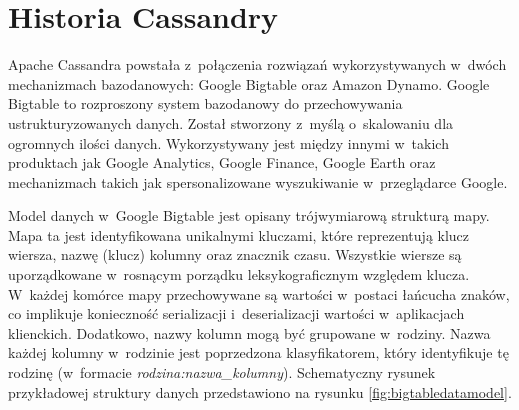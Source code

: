\section{Historia Cassandry}

Apache Cassandra powstała z~połączenia rozwiązań wykorzystywanych w~dwóch mechanizmach bazodanowych: Google Bigtable oraz Amazon Dynamo. Google Bigtable to rozproszony system bazodanowy do przechowywania ustrukturyzowanych danych. Został stworzony z~myślą o~skalowaniu dla ogromnych ilości danych. Wykorzystywany jest między innymi w~takich produktach jak Google Analytics, Google Finance, Google Earth oraz mechanizmach takich jak spersonalizowane wyszukiwanie w~przeglądarce Google. 

Model danych w~Google Bigtable jest opisany trójwymiarową strukturą mapy. Mapa ta jest identyfikowana unikalnymi kluczami, które reprezentują klucz wiersza, nazwę (klucz) kolumny oraz znacznik czasu. Wszystkie wiersze są uporządkowane w~rosnącym porządku leksykograficznym względem klucza. W~każdej komórce mapy przechowywane są wartości w~postaci łańcucha znaków, co implikuje konieczność serializacji i~deserializacji wartości w~aplikacjach klienckich. Dodatkowo, nazwy kolumn mogą być grupowane w~rodziny. Nazwa każdej kolumny w~rodzinie jest poprzedzona klasyfikatorem, który identyfikuje tę rodzinę (w~formacie \emph{rodzina:nazwa\_kolumny}). \cite{googlebigtable} Schematyczny rysunek przykładowej struktury danych przedstawiono na rysunku \ref{fig:bigtabledatamodel}.


